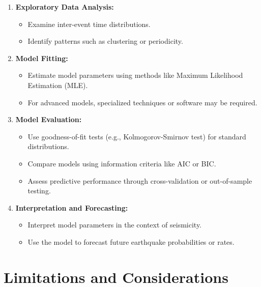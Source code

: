 \documentclass{article}
\begin{document}
\begin{enumerate}
    \item \textbf{Exploratory Data Analysis:}

    \begin{itemize}
        \item Examine inter-event time distributions.
        \item Identify patterns such as clustering or periodicity.
    \end{itemize}

    \item \textbf{Model Fitting:}

    \begin{itemize}
        \item Estimate model parameters using methods like Maximum Likelihood Estimation (MLE).
        \item For advanced models, specialized techniques or software may be required.
    \end{itemize}

    \item \textbf{Model Evaluation:}

    \begin{itemize}
        \item Use goodness-of-fit tests (e.g., Kolmogorov-Smirnov test) for standard distributions.
        \item Compare models using information criteria like AIC or BIC.
        \item Assess predictive performance through cross-validation or out-of-sample testing.
    \end{itemize}

    \item \textbf{Interpretation and Forecasting:}

    \begin{itemize}
        \item Interpret model parameters in the context of seismicity.
        \item Use the model to forecast future earthquake probabilities or rates.
    \end{itemize}
\end{enumerate}

\section{Limitations and Considerations}
\end{document}
